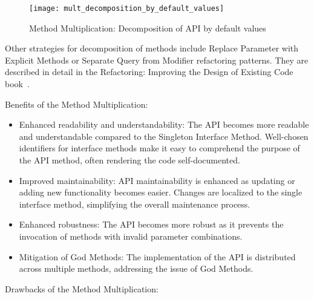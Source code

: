 \begin{figure}[!htb]
    \centering
    \texttt{[image: mult\_decomposition\_by\_default\_values]}
    \caption{Method Multiplication: Decomposition of API by default values}
    \label{fig:mult_decomposition_by_default_values}
\end{figure}

Other strategies for decomposition of methods include Replace Parameter with Explicit Methods or
Separate Query from Modifier refactoring patterns.
They are described in detail in the Refactoring: Improving the Design of Existing Code
book~\cite[Chapter~10]{fowler1999refactoring}.

Benefits of the Method Multiplication:

\begin{itemize}
    \item Enhanced readability and understandability:
    The API becomes more readable and understandable compared to the Singleton Interface Method.
    Well-chosen identifiers for interface methods make it easy to comprehend the purpose of the API method,
    often rendering the code self-documented.
    \item Improved maintainability:
    API maintainability is enhanced as updating or adding new functionality becomes easier.
    Changes are localized to the single interface method, simplifying the overall maintenance process.
    \item Enhanced robustness:
    The API becomes more robust as it prevents the invocation of methods with invalid parameter combinations.
    \item Mitigation of God Methods:
    The implementation of the API is distributed across multiple methods, addressing the issue of God Methods.
\end{itemize}

Drawbacks of the Method Multiplication:

